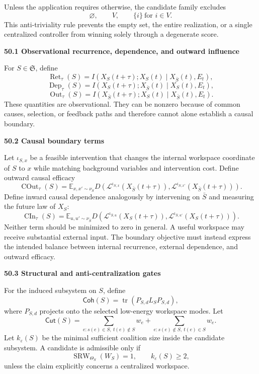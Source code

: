 \documentclass[11pt,letterpaper]{article}
\newcommand{\Ret}{\operatorname{Ret}}
\newcommand{\Dep}{\operatorname{Dep}}
\newcommand{\Out}{\operatorname{Out}}
\newcommand{\COut}{\operatorname{COut}}
\newcommand{\CIn}{\operatorname{CIn}}
\newcommand{\subtopic}[1]{%
 \vspace{0.45em}
 {\bfseries\color{AccentColor} #1\par}
}
\theoremstyle{plain}
\theoremstyle{definition}
\begin{document}
Unless the application requires otherwise, the candidate family excludes
\[
\varnothing,
\qquad
V,
\qquad
\{i\}\ \text{for }i\in V.
\]
This anti-triviality rule prevents the empty set, the entire realization, or a
single centralized controller from winning solely through a degenerate score.

\subtopic{50.1 Observational recurrence, dependence, and outward influence}

For \(S\in\mathfrak S\), define
\[
\Ret_\tau(S)
=
I\!\left(
X_S(t+\tau);X_S(t)
\mid X_{\bar S}(t),E_t
\right),
\]
\[
\Dep_\tau(S)
=
I\!\left(
X_S(t+\tau);X_{\bar S}(t)
\mid X_S(t),E_t
\right),
\]
\[
\Out_\tau(S)
=
I\!\left(
X_{\bar S}(t+\tau);X_S(t)
\mid X_{\bar S}(t),E_t
\right).
\]
These quantities are observational. They can be nonzero because of common
causes, selection, or feedback paths and therefore cannot alone establish a
causal boundary.

\subtopic{50.2 Causal boundary terms}

Let \(\iota_{S,x}\) be a feasible intervention that changes the internal
workspace coordinate of \(S\) to \(x\) while matching background variables and
intervention cost. Define outward causal efficacy
\[
\boxed{
\COut_\tau(S)
=
\mathbb E_{x,x'\sim\nu_S}
D\!\left(
\mathcal L^{\iota_{S,x}}
(X_{\bar S}(t+\tau)),
\mathcal L^{\iota_{S,x'}}
(X_{\bar S}(t+\tau))
\right).
}
\]
Define inward causal dependence analogously by intervening on \(\bar S\) and
measuring the future law of \(X_S\):
\[
\boxed{
\CIn_\tau(S)
=
\mathbb E_{u,u'\sim\nu_{\bar S}}
D\!\left(
\mathcal L^{\iota_{\bar S,u}}
(X_S(t+\tau)),
\mathcal L^{\iota_{\bar S,u'}}
(X_S(t+\tau))
\right).
}
\]
Neither term should be minimized to zero in general. A useful workspace may
receive substantial external input. The boundary objective must instead
express the intended balance between internal recurrence, external dependence,
and outward efficacy.

\subtopic{50.3 Structural and anti-centralization gates}

For the induced subsystem on \(S\), define
\[
\mathsf{Coh}(S)
=
\operatorname{tr}
\left(
P_{S,d}L_SP_{S,d}
\right),
\]
where \(P_{S,d}\) projects onto the selected low-energy workspace modes. Let
\[
\mathsf{Cut}(S)
=
\sum_{e:s(e)\in S,\ t(e)\notin S}w_e
+
\sum_{e:s(e)\notin S,\ t(e)\in S}w_e.
\]
Let \(k_\varepsilon(S)\) be the minimal sufficient coalition size inside the
candidate subsystem. A candidate is admissible only if
\[
\operatorname{SRW}_{\Theta_S}(W_S)=1,
\qquad
k_\varepsilon(S)\geq2,
\]
unless the claim explicitly concerns a centralized workspace.
\end{document}

